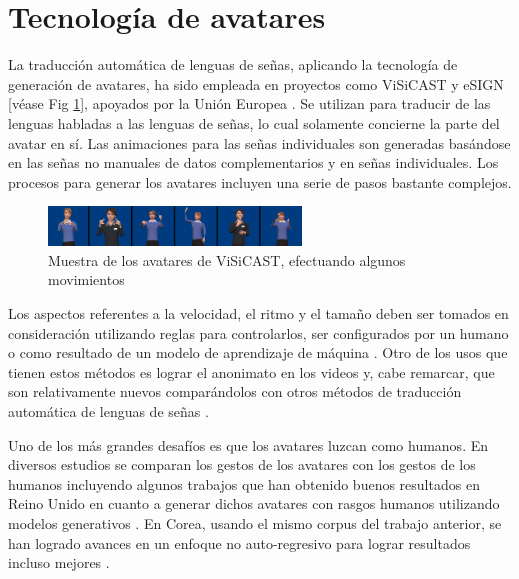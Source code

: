 \section{Tecnología de avatares}\label{section:state-of-the-art:avatars}

La traducción automática de lenguas de señas, aplicando la tecnología de generación de avatares, ha sido empleada en proyectos como ViSiCAST  y eSIGN [véase Fig \ref{fig:avatares-visicast}], apoyados por la Unión Europea  . Se utilizan para traducir de las lenguas habladas a las lenguas de señas, lo cual solamente concierne la parte del avatar en sí. Las animaciones para las señas individuales son generadas basándose en las señas no manuales de datos complementarios y en señas individuales. Los procesos para generar los avatares incluyen una serie de pasos bastante complejos.
 
\begin{figure}[ht!]
    \centering
    \includegraphics[width=0.6\textwidth]{Graphics/avatares_visicast.png}
    \caption{Muestra de los avatares de ViSiCAST, efectuando algunos movimientos}
    \label{fig:avatares-visicast}
\end{figure}

 
Los aspectos referentes a la velocidad, el ritmo y el tamaño deben ser tomados en
consideración utilizando reglas para controlarlos, ser configurados por un humano o
como resultado de un modelo de aprendizaje de máquina . Otro de los usos que tienen estos métodos es lograr el anonimato en los videos y, cabe remarcar, que  son relativamente nuevos comparándolos con otros métodos de traducción automática de lenguas de señas  .

Uno de los más grandes desafíos es que los avatares luzcan como humanos. En diversos estudios se comparan los gestos de los avatares con los gestos de los
humanos incluyendo algunos trabajos que han obtenido buenos resultados en Reino Unido en cuanto a generar dichos avatares con rasgos humanos utilizando modelos generativos . En Corea, usando el mismo corpus del trabajo anterior, se han logrado avances en un enfoque no auto-regresivo para lograr resultados incluso mejores .

